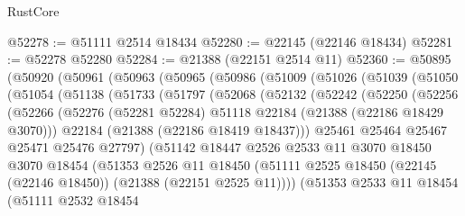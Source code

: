 \begin{lexlean}{RustCore}
\begin{coremodule}
@52278 := @51111 @2514 @18434
@52280 := @22145 (@22146 @18434)
@52281 := @52278 @52280
@52284 := @21388 (@22151 @2514 @11)
@52360 := @50895
    (@50920
      (@50961
        (@50963
          (@50965
            (@50986
              (@51009
                (@51026
                  (@51039
                    (@51050
                      (@51054
                        (@51138
                          (@51733
                            (@51797
                              (@52068
                                (@52132
                                  (@52242
                                    (@52250
                                      (@52256
                                        (@52266
                                          (@52276
                                            (@52281 @52284)
                                            @51118
                                            @22184
                                            (@21388 (@22186 @18429 @3070)))
                                          @22184
                                          (@21388 (@22186 @18419 @18437)))
                                        @25461
                                        @25464
                                        @25467
                                        @25471
                                        @25476
                                        @27797)
                                      (@51142
                                        @18447
                                        @2526
                                        @2533
                                        @11
                                        @3070
                                        @18450
                                        @3070
                                        @18454
                                        (@51353
                                          @2526
                                          @11
                                          @18450
                                          (@51111
                                            @2525
                                            @18450
                                            (@22145 (@22146 @18450))
                                            (@21388 (@22151 @2525 @11))))
                                        (@51353
                                          @2533
                                          @11
                                          @18454
                                          (@51111
                                            @2532
                                            @18454

\end{coremodule}
\end{lexlean}
